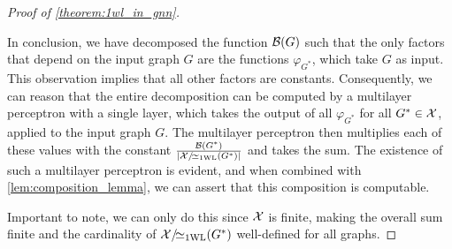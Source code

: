 \begin{proof}[Proof of \cref*{theorem:1wl_in_gnn}]
\begin{itemize}[leftmargin=9em]
    \end{itemize}
    In conclusion, we have decomposed the \gnn function $\mathcal{B}(G)$ such that the only factors that depend on the input graph $G$ are the functions $\varphi_{G^*}$, which take $G$ as input. This observation implies that all other factors are constants. Consequently, we can reason that the entire decomposition can be computed by a multilayer perceptron with a single layer, which takes the output of all $\varphi_{G^*}$ for all $G^* \in \mathcal{X}$, applied to the input graph $G$. The multilayer perceptron then multiplies each of these values with the constant $\frac{\mathcal{B}(G^*)}{|\mathcal{X}/\!{\simeq_{\text{1WL}}}(G^*)|}$ and takes the sum. The existence of such a multilayer perceptron is evident, and when combined with \cref{lem:composition_lemma}, we can assert that this composition is \wlnn computable.

    Important to note, we can only do this since $\mathcal{X}$ is finite, making the overall sum finite and the cardinality of $\mathcal{X}/\!{\simeq_{\text{1WL}}}(G^*)$ well-defined for all graphs.
\end{proof}